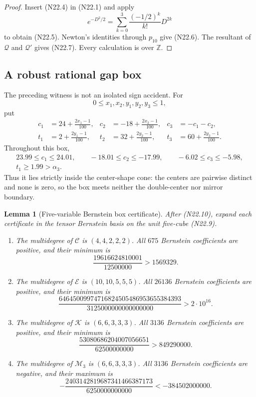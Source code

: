 \documentclass[11pt]{article}
\newtheorem{lemma}[theorem]{Lemma}
\theoremstyle{definition}
\theoremstyle{remark}
\begin{document}
\begin{proof}
Insert \textup{(N22.4)} in \textup{(N22.1)} and apply
\[
 e^{-D^2/2}
 =\sum_{k=0}^3\frac{(-1/2)^k}{k!}D^{2k}
 \tag{N22.8}
\]
to obtain \textup{(N22.5)}.  Newton's identities through \(p_{10}\)
give \textup{(N22.6)}.  The resultant of \(\mathcal Q\) and
\(\mathcal Q'\) gives \textup{(N22.7)}.  Every calculation is over
\(\mathbb Z\).
\end{proof}

\subsection{A robust rational gap box}
\label{subsec:f2v22-box}

The preceding witness is not an isolated sign accident.  For
\[
 0\leq x_1,x_2,y_1,y_2,y_3\leq1,
 \tag{N22.9}
\]
put
\[
\begin{aligned}
 c_1&=24+\frac{2x_1-1}{100},&
 c_2&=-18+\frac{2x_2-1}{100},&
 c_3&=-c_1-c_2,\\
 t_1&=2+\frac{2y_1-1}{100},&
 t_2&=32+\frac{2y_2-1}{100},&
 t_3&=60+\frac{2y_3-1}{100}.
\end{aligned}
\tag{N22.10}
\]
Throughout this box,
\[
\begin{gathered}
 23.99\leq c_1\leq24.01,\qquad
 -18.01\leq c_2\leq-17.99,\qquad
 -6.02\leq c_3\leq-5.98,\\
 t_1\geq1.99>\alpha_3.
\end{gathered}
\tag{N22.11}
\]
Thus it lies strictly inside the center-shape cone: the centers are
pairwise distinct and none is zero, so the box meets neither the
double-center nor mirror boundary.

\begin{lemma}[Five-variable Bernstein box certificate]
\label{lem:f2v22-box-ledger}
After \textup{(N22.10)}, expand each certificate in the tensor Bernstein
basis on the unit five-cube \textup{(N22.9)}.

\begin{enumerate}[label=\textup{(\roman*)}]
\item The multidegree of \(\mathcal C\) is \((4,4,2,2,2)\).
All \(675\) Bernstein coefficients are positive, and their minimum is
\[
 \frac{19616624810001}{12500000}>1569329.
 \tag{N22.12}
\]

\item The multidegree of \(\mathcal E\) is \((10,10,5,5,5)\).
All \(26136\) Bernstein coefficients are positive, and their minimum is
\[
 \frac{64645009974716824505486953655384393}
      {3125000000000000000}>2\cdot10^{16}.
 \tag{N22.13}
\]

\item The multidegree of \(\mathcal K\) is \((6,6,3,3,3)\).
All \(3136\) Bernstein coefficients are positive, and their minimum is
\[
 \frac{53080686204007056651}{62500000000}>849290000.
 \tag{N22.14}
\]

\item The multidegree of \(\mathcal M_3\) is \((6,6,3,3,3)\).
All \(3136\) Bernstein coefficients are negative, and their maximum is
\[
 -\frac{2403142819687341466387173}{6250000000000}
 <-384502000000.
 \tag{N22.15}
\]
\end{enumerate}
\end{lemma}
\end{document}
